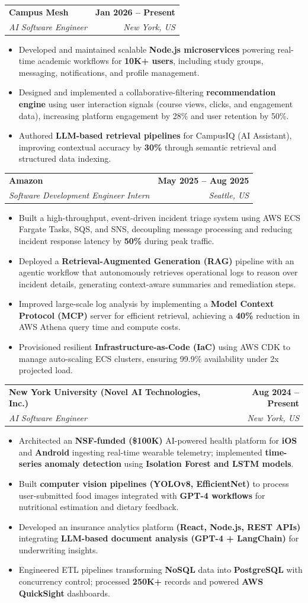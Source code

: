 \documentclass[letterpaper]{article}
\makeatletter
\newcommand{\resumeItem}[1]{
\item\small{{#1}\vspace{-3.5pt}}
}
\newcommand{\resumeSubheading}[4]{
\vspace{6pt} %
\item
\begin{tabular*}{1.0\textwidth}[t]{l@{\extracolsep{\fill}}r}
\textbf{#1} & \textbf{\small #2} \\
\textit{\small#3} & \textit{\small #4} \\
\end{tabular*}\vspace{-5.5pt}
}
\newcommand{\resumeItemListStart}{\begin{itemize}[leftmargin=*, itemsep=0pt, topsep=0pt]}
\newcommand{\resumeItemListEnd}{\end{itemize}\vspace{-3pt}}
\makeatother
\begin{document}
\resumeSubheading
{Campus Mesh}{Jan 2026 -- Present}
{AI Software Engineer}{New York, US}
\resumeItemListStart
\resumeItem{Developed and maintained scalable \textbf{Node.js microservices} powering real-time academic workflows for \textbf{10K+ users}, including study groups, messaging, notifications, and profile management.}
\resumeItem{ Designed and implemented a collaborative-filtering \textbf{recommendation engine} using user interaction signals (course views, clicks, and engagement data), increasing platform engagement by 28\% and user retention by 50\%.}
\resumeItem{Authored \textbf{LLM-based retrieval pipelines} for CampusIQ (AI Assistant), improving contextual accuracy by \textbf{30\%} through semantic retrieval and structured data indexing.}
\resumeItemListEnd


\resumeSubheading
{Amazon}{May 2025 -- Aug 2025}
{Software Development Engineer Intern}{Seattle, US}
\resumeItemListStart
\resumeItem{Built a high-throughput, event-driven incident triage system using AWS ECS Fargate Tasks, SQS, and SNS, decoupling message processing and reducing incident response latency by \textbf{50\%} during peak traffic.}
\resumeItem{ Deployed a \textbf{Retrieval-Augmented Generation (RAG)} pipeline with an agentic workflow that autonomously retrieves operational logs to reason over incident details, generating context-aware summaries and remediation steps.}
\resumeItem{Improved large-scale log analysis by implementing a \textbf{Model Context Protocol (MCP)} server for efficient retrieval, achieving a \textbf{40\%} reduction in AWS Athena query time and compute costs.}
\resumeItem{Provisioned resilient \textbf{Infrastructure-as-Code (IaC)} using AWS CDK to manage auto-scaling ECS clusters, ensuring 99.9\% availability under 2x projected load.}
\resumeItemListEnd


\resumeSubheading
{New York University (Novel AI Technologies, Inc.)
\href{https://mybeatshealth.com/home}{\faExternalLink}
\href{https://broker.mybeatshealth.com/}{\faExternalLink}}
{Aug 2024 -- Present}
{AI Software Engineer}{New York, US}
\resumeItemListStart
\resumeItem{Architected an \textbf{NSF-funded (\$100K)} AI-powered health platform for \textbf{iOS} and \textbf{Android} ingesting real-time wearable telemetry; implemented \textbf{time-series anomaly detection} using \textbf{Isolation Forest and LSTM models}.}
\resumeItem{Built \textbf{computer vision pipelines (YOLOv8, EfficientNet)} to process user-submitted food images integrated with \textbf{GPT-4 workflows} for nutritional estimation and dietary feedback.}
\resumeItem{Developed an insurance analytics platform \textbf{(React, Node.js, REST APIs)} integrating \textbf{LLM-based document analysis (GPT-4 + LangChain)} for underwriting insights.}
\resumeItem{Engineered ETL pipelines transforming \textbf{NoSQL} data into \textbf{PostgreSQL} with concurrency control; processed \textbf{250K+} records and powered \textbf{AWS QuickSight} dashboards.}
\resumeItemListEnd
\end{document}
